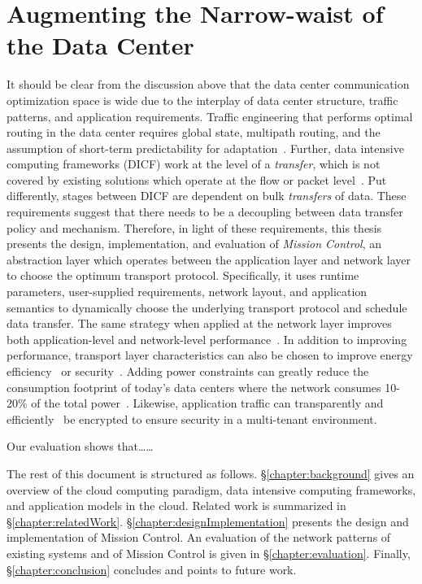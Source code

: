 \documentclass[a4paper,12pt,twoside,openright]{report}
\begin{document}
\section{Augmenting the Narrow-waist of the Data Center}
It should be clear from the discussion above that the data center communication
optimization space is wide due to the interplay of data center structure,
traffic patterns, and application requirements. Traffic engineering that
performs optimal routing in the data center requires global state, multipath
routing, and the assumption of short-term predictability for
adaptation~\cite{Benson:2010:CFT,Benson:2011:MFG}. Further, data intensive
computing frameworks (DICF) work at the level of a \emph{transfer}, which is not
covered by existing solutions which operate at the flow or packet
level~\cite{Chowdhury:2011:MDT}. Put differently, stages between DICF are
dependent on bulk \emph{transfers} of data. These requirements suggest that
there needs to be a decoupling between data transfer policy and mechanism.
Therefore, in light of these requirements, this thesis presents the design,
implementation, and evaluation of \emph{Mission Control}, an abstraction layer
which operates between the application layer and network layer to choose the
optimum transport protocol. Specifically, it uses runtime parameters,
user-supplied requirements, network layout, and application semantics to
dynamically choose the underlying transport protocol and schedule data transfer.
The same strategy when applied at the network layer improves both
application-level and network-level performance~\cite{Abu-Libdeh:2010:SRF}. In
addition to improving performance, transport layer characteristics can also be
chosen to improve energy efficiency~\cite{Heller:2010:ESE} or
security~\cite{bittau:the}. Adding power constraints can greatly reduce the
consumption footprint of today's data centers where the network consumes 10-20\%
of the total power~\cite{Greenberg:2008:CCR}. Likewise, application traffic can
transparently and efficiently~\cite{bittau:the} be encrypted to ensure security
in a multi-tenant environment.

Our evaluation shows that\ldots\ldots

The rest of this document is structured as follows. \S\ref{chapter:background}
gives an overview of the cloud computing paradigm, data intensive computing
frameworks, and application models in the cloud. Related work is summarized in
\S\ref{chapter:relatedWork}. \S\ref{chapter:designImplementation} presents the
design and implementation of Mission Control. An evaluation of the network
patterns of existing systems and of Mission Control is given in
\S\ref{chapter:evaluation}. Finally, \S\ref{chapter:conclusion} concludes and
points to future work.
\end{document}
